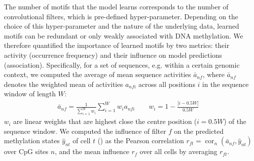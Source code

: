 The number of motifs that the model learns corresponds to the number of convolutional filters, which is pre-defined hyper-parameter. Depending on the choice of this hyper-parameter and the nature of the underlying data, learned motifs can be redundant or only weakly associated with DNA methylation. We therefore quantified the importance of learned motifs by two metrics: their activity (occurrence frequency) and their influence on model predictions (association). Specifically, for a set of sequences, e.g. within a certain genomic context, we computed the average of mean sequence activities $\bar{a}_{nf}$, where $\bar{a}_{nf}$ denotes the weighted mean of activities $a_{nfi}$ across all positions $i$ in the sequence window of length $W$:
\begin{align}
  \bar{a}_{nf}=\frac{1}{\sum_{i=1}^W w_i} \sum_{i=1}^W w_i a_{nfi} \qquad w_i=1-\frac{|i-0.5W|}{0.5W}
\end{align}
$w_i$ are linear weights that are highest close the centre position ($i=0.5W$) of the sequence window. We computed the influence of filter $f$ on the predicted methylation states $\hat{y}_{nt}$ of cell $t$ () as the Pearson correlation $r_{ft}=\operatorname{cor}_n(\bar{a}_{nf},\hat{y}_{nt})$ over CpG sites $n$, and the mean influence $r_f$ over all cells by averaging $r_{ft}$.

